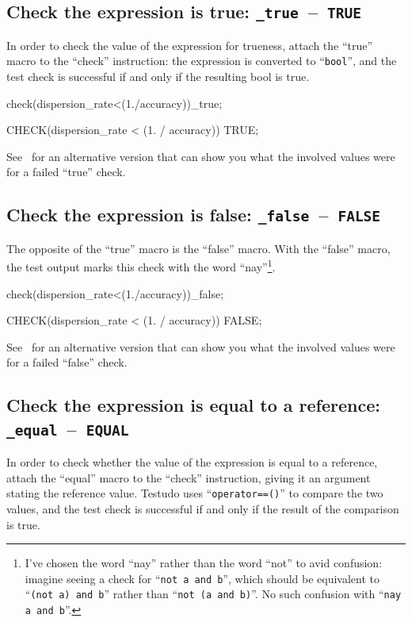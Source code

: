 \documentclass[twoside, a4paper, article]{memoir}
\newcommand*\testudocolor{\color{red!80!blue}}
\newcommand*\testudo[1]{\texttt{\testudocolor{}#1}}
\newcommand*\testudopair[2]{\testudo{#1}~--~\testudo{#2}}
\newcommand\subsectiontestudopair[3]{%
  \subsection[#1]{#1: \testudopair{#2}{#3}}}
\begin{document}
\subsectiontestudopair{Check the expression is true}{\_true}{TRUE}
\label{sec:check-expression-true}

In order to check the value of the expression for trueness, attach the ``true''
macro to the ``check'' instruction: the expression is converted to
``\texttt{bool}'', and the test check is successful if and only if the
resulting bool is true.

\begin{cpplisting}
check(dispersion_rate<(1./accuracy))_true;
\end{cpplisting}

\begin{cpplisting}
CHECK(dispersion_rate < (1. / accuracy)) TRUE;
\end{cpplisting}

See~ for an alternative version that can
show you what the involved values were for a failed ``true'' check.

\subsectiontestudopair{Check the expression is false}{\_false}{FALSE}
\label{sec:check-expression-true}

The opposite of the ``true'' macro is the ``false'' macro.  With the ``false''
macro, the test output marks this check with the word ``nay''\footnote{I've
  chosen the word ``nay'' rather than the word ``not'' to avid confusion:
  imagine seeing a check for ``\texttt{not a and b}'', which should be
  equivalent to ``\texttt{(not a) and b}'' rather than ``\texttt{not (a and
    b)}''.  No such confusion with ``\texttt{nay a and b}''.}.

\begin{cpplisting}
check(dispersion_rate<(1./accuracy))_false;
\end{cpplisting}

\begin{cpplisting}
CHECK(dispersion_rate < (1. / accuracy)) FALSE;
\end{cpplisting}

See~ for an alternative version that can
show you what the involved values were for a failed ``false'' check.

\subsectiontestudopair{Check the expression is equal to a reference}%
  {\_equal}{EQUAL}
\label{sec:check-expression-equal-reference}

In order to check whether the value of the expression is equal to a reference,
attach the ``equal'' macro to the ``check'' instruction, giving it an argument
stating the reference value.  Testudo uses ``\texttt{operator==()}'' to
compare the two values, and the test check is successful if and only if the
result of the comparison is true.
\end{document}
